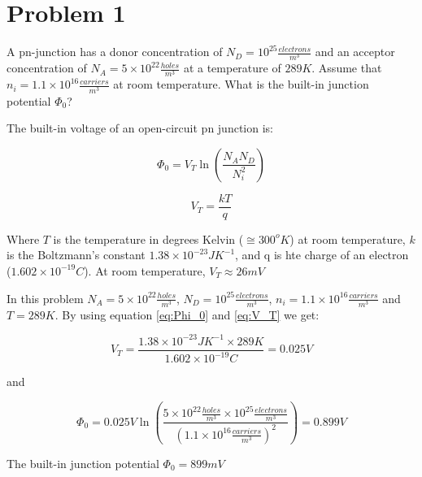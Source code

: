 \section{Problem 1}

A pn-junction has a donor concentration of $N_D = 10^{25} \frac{electrons}{m^3}$ and an acceptor concentration of $N_A = 5\times 10^{22} \frac{holes}{m^3}$ at a temperature of $289 K$. Assume that $n_i = 1.1\times 10^{16} \frac{carriers}{m^3}$ at room temperature. What is the built-in junction potential $\Phi_0$?

The built-in voltage of an open-circuit pn junction is:

\begin{equation}
    \Phi_0 = V_T \ln (\frac{N_A N_D}{N_i^2})
    \label{eq:Phi_0}
\end{equation}

\begin{equation}
    V_T=\frac{kT}{q}
    \label{eq:V_T}
\end{equation}

Where $T$ is the temperature in degrees Kelvin ($\cong 300 ^o K$) at room temperature, $k$ is the Boltzmann's constant $1.38\times 10^{-23} JK^{-1}$, and q is hte charge of an electron ($1.602\times 10^{-19} C$). At room temperature, $V_T\approx 26 mV$

In this problem $N_A=5\times 10^{22} \frac{holes}{m^3}$, $N_D = 10^{25} \frac{electrons}{m^3}$, $n_i = 1.1\times 10^{16} \frac{carriers}{m^3}$ and $T=289 K$. By using equation \ref{eq:Phi_0} and \ref{eq:V_T} we get:

\begin{equation}
    V_T=\frac{1.38\times 10^{-23} JK^{-1} \times 289K}{1.602\times 10^{-19} C} = 0.025V
\end{equation}

and

\begin{equation}
    \Phi_0 = 0.025V \ln (\frac{5\times 10^{22} \frac{holes}{m^3} \times 10^{25} \frac{electrons}{m^3}}{(1.1\times 10^{16} \frac{carriers}{m^3})^2}) = 0.899V
\end{equation}

The built-in junction potential $\Phi_0 = 899mV$

